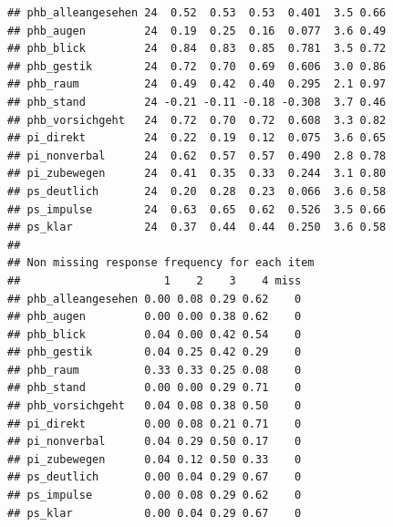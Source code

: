 \documentclass[
  english,
  man,floatsintext]{apa6}
\begin{document}
\begin{verbatim}
## phb_alleangesehen 24  0.52  0.53  0.53  0.401  3.5 0.66
## phb_augen         24  0.19  0.25  0.16  0.077  3.6 0.49
## phb_blick         24  0.84  0.83  0.85  0.781  3.5 0.72
## phb_gestik        24  0.72  0.70  0.69  0.606  3.0 0.86
## phb_raum          24  0.49  0.42  0.40  0.295  2.1 0.97
## phb_stand         24 -0.21 -0.11 -0.18 -0.308  3.7 0.46
## phb_vorsichgeht   24  0.72  0.70  0.72  0.608  3.3 0.82
## pi_direkt         24  0.22  0.19  0.12  0.075  3.6 0.65
## pi_nonverbal      24  0.62  0.57  0.57  0.490  2.8 0.78
## pi_zubewegen      24  0.41  0.35  0.33  0.244  3.1 0.80
## ps_deutlich       24  0.20  0.28  0.23  0.066  3.6 0.58
## ps_impulse        24  0.63  0.65  0.62  0.526  3.5 0.66
## ps_klar           24  0.37  0.44  0.44  0.250  3.6 0.58
## 
## Non missing response frequency for each item
##                      1    2    3    4 miss
## phb_alleangesehen 0.00 0.08 0.29 0.62    0
## phb_augen         0.00 0.00 0.38 0.62    0
## phb_blick         0.04 0.00 0.42 0.54    0
## phb_gestik        0.04 0.25 0.42 0.29    0
## phb_raum          0.33 0.33 0.25 0.08    0
## phb_stand         0.00 0.00 0.29 0.71    0
## phb_vorsichgeht   0.04 0.08 0.38 0.50    0
## pi_direkt         0.00 0.08 0.21 0.71    0
## pi_nonverbal      0.04 0.29 0.50 0.17    0
## pi_zubewegen      0.04 0.12 0.50 0.33    0
## ps_deutlich       0.00 0.04 0.29 0.67    0
## ps_impulse        0.00 0.08 0.29 0.62    0
## ps_klar           0.00 0.04 0.29 0.67    0
\end{verbatim}
\end{document}
